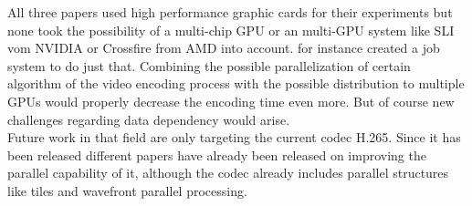 All three papers used high performance graphic cards for their experiments but none took the possibility of a multi-chip GPU or an multi-GPU system like SLI vom NVIDIA or Crossfire from AMD into account. 
\cite{multigpu} for instance created a job system to do just that. Combining the possible parallelization of certain algorithm of the video encoding process with the possible distribution to multiple GPUs 
would properly decrease the encoding time even more. But of course new challenges regarding data dependency would arise. \\

Future work in that field are only targeting the current codec H.265. 
Since it has been released different papers have already been released on improving the parallel capability of it, 
although the codec already includes parallel structures like tiles and wavefront parallel processing.